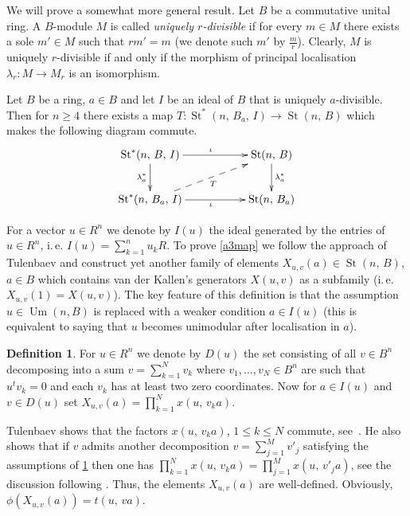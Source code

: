 \documentclass[11pt]{amsart}
\theoremstyle{plain} \declaretheorem[name=Theorem, Refname={Theorem,Theorems}]{tm} \Crefname{tm}{Theorem}{Theorems}
\numberwithin{equation}{section}
\theoremstyle{definition} \newtheorem{df}[lm]{Definition} \Crefname{df}{Definition}{Definitions}
\theoremstyle{remark} \newtheorem{rk}[lm]{Remark} \Crefname{rk}{Remark}{Remarks}
\newcommand{\E}{{\mathrm{E}}}
\newcommand{\Um}{\mathop{\mathrm{Um}}\nolimits}
\newcommand{\St}{\mathop{\mathrm{St}}\nolimits}
\begin{document}
We will prove a somewhat more general result. Let $B$ be a commutative unital ring.
A $B$-module $M$ is called \emph{uniquely $r$-divisible} if for every $m\in M$ there exists a sole $m'\in M$ such that $rm' = m$ (we denote such $m'$ by $\frac{m}{r}$).
Clearly, $M$ is uniquely $r$-divisible if and only if the morphism of principal localisation $\lambda_r\colon M \to M_r$ is an isomorphism.

\begin{tm} \label{a3map} Let $B$ be a ring, $a\in B$ and let $I$ be an ideal of $B$ that is uniquely $a$-divisible.
Then for $n\geq 4$ there exists a map $T\colon\St^*(n,\,B_a,\,I)\rightarrow\St(n,\,B)$ which makes the following diagram commute.
\begin{equation} \xymatrix{ \St^*(n,\,B,\,I)\ar@<-0.0ex>[rr]^{\iota}\ar@<-0.0ex>[d]_{\lambda_{a}^*} && \St(n,\,B)\ar@<-0.0ex>[d]^{\lambda_{a}^*}\\
                            \St^*(n,\,B_a,\,I)\ar@<-0.0ex>[rr]_{\iota}\ar@{-->}[rru]_{T}            && \St(n,\,B_a)} \label{eq:a3diag} \end{equation} \end{tm}

For a vector $u\in R^n$ we denote by $I(u)$ the ideal generated by the entries of $u\in R^n$, i.\,e. $I(u)=\sum\limits_{k=1}^nu_kR$.
To prove \cref{a3map} we follow the approach of Tulenbaev and construct yet another family of elements $X_{u,v}(a)\in \St(n,\,B)$, $a\in B$ which contains van der Kallen's generators $X(u, v)$ as a subfamily (i.\,e. $X_{u,v}(1) = X(u, v)$).
The key feature of this definition is that the assumption $u \in\Um(n, B)$ is replaced with a weaker condition $a \in I(u)$ (this is equivalent to saying that $u$ becomes unimodular after localisation in $a$).

\setcounter{df}{1}
\begin{df} \label{df:TulX}
For $u \in R^n$ we denote by $D(u)$ the set consisting of all $v\in B^n$ decomposing into a sum $v=\sum_{k=1}^Nv_k$ where $v_1,\ldots,v_N\in B^n$ are such that $u^tv_k=0$ and each $v_k$ has at least two zero coordinates.
Now for $a\in I(u)$ and $v \in D(u)$ set $X_{u,v}(a) = \prod\limits_{k=1}^Nx(u,\,v_ka)$.
\end{df}
Tulenbaev shows that the factors $x(u,\,v_ka)$, $1\leq k\leq N$ commute, see~\cite[Lemma~1.1\,e)]{Tul}.
He also shows that if $v$ admits another decomposition $v=\sum_{j=1}^Mv'_j$ satisfying the assumptions of \cref{df:TulX} then one has
$\prod_{k=1}^Nx(u,\,v_ka)=\prod_{j=1}^Mx(u,\,v'_ja)$, see the discussion following \cite[Lemma~1.1]{Tul}.
Thus, the elements $X_{u,v}(a)$ are well-defined. Obviously, $\phi(X_{u,v}(a))=t(u,\,va)$.
\end{document}
